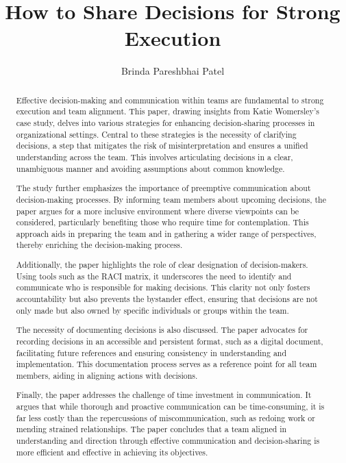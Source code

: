 \documentclass[runningheads]{llncs}
\begin{document}
%
\title{How to Share Decisions for Strong Execution}
%
%
\author{Brinda Pareshbhai Patel}
%

%
\maketitle              %
%

\begin{abstract}
Effective decision-making and communication within teams are fundamental to strong execution and team alignment. This paper, drawing insights from Katie Womersley's case study, delves into various strategies for enhancing decision-sharing processes in organizational settings. Central to these strategies is the necessity of clarifying decisions, a step that mitigates the risk of misinterpretation and ensures a unified understanding across the team. This involves articulating decisions in a clear, unambiguous manner and avoiding assumptions about common knowledge.

The study further emphasizes the importance of preemptive communication about decision-making processes. By informing team members about upcoming decisions, the paper argues for a more inclusive environment where diverse viewpoints can be considered, particularly benefiting those who require time for contemplation. This approach aids in preparing the team and in gathering a wider range of perspectives, thereby enriching the decision-making process.

Additionally, the paper highlights the role of clear designation of decision-makers. Using tools such as the RACI matrix, it underscores the need to identify and communicate who is responsible for making decisions. This clarity not only fosters accountability but also prevents the bystander effect, ensuring that decisions are not only made but also owned by specific individuals or groups within the team.

The necessity of documenting decisions is also discussed. The paper advocates for recording decisions in an accessible and persistent format, such as a digital document, facilitating future references and ensuring consistency in understanding and implementation. This documentation process serves as a reference point for all team members, aiding in aligning actions with decisions.

Finally, the paper addresses the challenge of time investment in communication. It argues that while thorough and proactive communication can be time-consuming, it is far less costly than the repercussions of miscommunication, such as redoing work or mending strained relationships. The paper concludes that a team aligned in understanding and direction through effective communication and decision-sharing is more efficient and effective in achieving its objectives.
\end{abstract}
\end{document}
